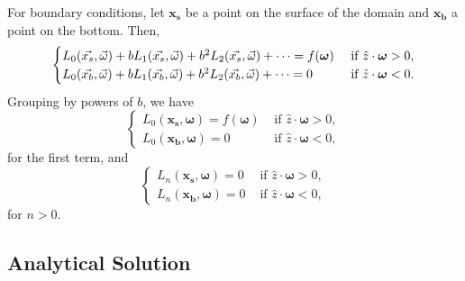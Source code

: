 \documentclass[ms,cpyr,lof,lot]{uathesis}
\renewcommand\vec\bm
\begin{document}
For boundary conditions, let $\vec{x_s}$ be a point on the surface of the domain and $\vec{x_b}$ a point on the bottom.
Then,
\begin{equation*}
  \begin{cases}
    \Lasyms = f(\vec{\omega}) &\mbox{ if } \hat{z}\cdot\vec{\omega} > 0, \\
    \Lasymb = 0 &\mbox{ if } \hat{z}\cdot\vec{\omega} < 0.
    \end{cases}
\end{equation*}
Grouping by powers of $b$, we have
\begin{equation}
  \begin{cases}
    L_0(\vec{x_s}, \vec{\omega}) = f(\vec{\omega}) &\mbox{ if } \hat{z}\cdot\vec{\omega} > 0, \\
    L_0(\vec{x_b}, \vec{\omega}) = 0 &\mbox{ if } \hat{z}\cdot\vec{\omega} < 0,
  \end{cases}
  \label{eqn:asymptotics_bc_0}
\end{equation}
for the first term, and
\begin{equation}
  \begin{cases}
    L_n(\vec{x_s}, \vec{\omega}) = 0 &\mbox{ if } \hat{z}\cdot\vec{\omega} > 0, \\
    L_n(\vec{x_b}, \vec{\omega}) = 0 &\mbox{ if } \hat{z}\cdot\vec{\omega} < 0,
  \end{cases}
  \label{eqn:asymptotics_bc_n}
\end{equation}
for $n > 0$.

\subsection{Analytical Solution}
\label{sec:asymptotic_sol}
\end{document}
